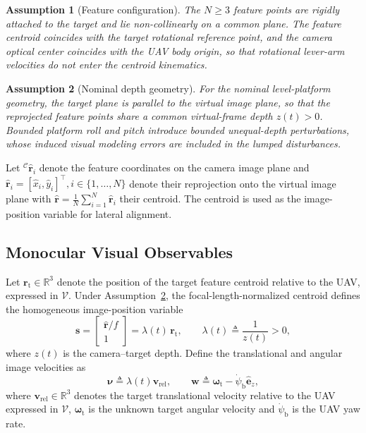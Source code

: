 \documentclass[10pt,conference]{IEEEtran}
\newtheorem{assumption}{Assumption}
\begin{document}
\begin{assumption}[Feature configuration]
\label{asm:feature_config}
The $N\geq3$ feature points are rigidly attached to the target and lie non-collinearly on a common plane. The feature centroid coincides with the target rotational reference point, and the camera optical center coincides with the UAV body origin, so that rotational lever-arm velocities do not enter the centroid kinematics.
\end{assumption}

\begin{assumption}[Nominal depth geometry]
\label{asm:depth_geometry}
For the nominal level-platform geometry, the target plane is parallel to the virtual image plane, so that the reprojected feature points share a common virtual-frame depth $z(t)>0$. Bounded platform roll and pitch introduce bounded unequal-depth perturbations, whose induced visual modeling errors are included in the lumped disturbances.
\end{assumption}

Let ${}^\mathcal{C}\hat{\boldsymbol{r}}_i$ denote the feature coordinates on the camera image plane and $\hat{\boldsymbol{r}}_i=[\hat{x}_i,\hat{y}_i]^\top, i\in\{1,\ldots,N\}$ denote their reprojection onto the virtual image plane with $\hat{\boldsymbol{r}} = \frac{1}{N}\sum_{i=1}^N\hat{\boldsymbol{r}}_i$ their centroid.
The centroid is used as the image-position variable for lateral alignment.

\subsection{Monocular Visual Observables}
Let $\boldsymbol{r}_\text{t}\in\mathbb R^3$ denote the position of the target feature centroid relative to the UAV, expressed in $\mathcal V$. 
Under Assumption~\ref{asm:depth_geometry}, the focal-length-normalized centroid defines the homogeneous image-position variable
\begin{equation}
    \boldsymbol{s} = \begin{bmatrix}\hat{\boldsymbol{r}}/f\\ 1\end{bmatrix} = \lambda(t)\,\boldsymbol{r}_\text{t}, \qquad \lambda(t)\triangleq\frac{1}{z(t)}>0,
    \label{image position: equation}
\end{equation}
where $z(t)$ is the camera--target depth.
Define the translational and angular image velocities as
\begin{equation}
    \boldsymbol{\nu}\triangleq\lambda(t)\boldsymbol v_{\mathrm{rel}}, \qquad
    \boldsymbol w \triangleq \boldsymbol\omega_{\mathrm t} - \dot\psi_{\mathrm b}\hat{\boldsymbol e}_z,
    \label{image velocities: equation}
\end{equation}
where $\boldsymbol v_{\mathrm{rel}}\in\mathbb R^3$ denotes the target translational velocity relative to the UAV expressed in $\mathcal V$, $\boldsymbol\omega_{\mathrm t}$ is the unknown target angular velocity
and $\dot\psi_{\mathrm b}$ is the UAV yaw rate.
\end{document}
